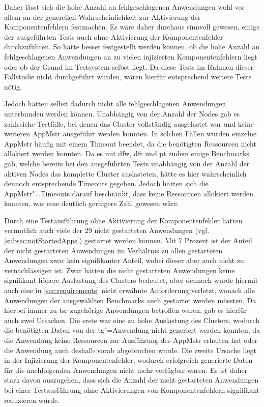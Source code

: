 Daher lässt sich die hohe Anzahl an fehlgeschlagenen Anwendungen wohl vor allem an der generellen Wahrscheinlichkeit zur Aktivierung der Komponentenfehlern festmachen.
Es wäre daher durchaus sinnvoll gewesen, einige der ausgeführten Tests auch ohne Aktivierung der Komponentenfehler durchzuführen.
So hätte besser festgestellt werden können, ob die hohe Anzahl an fehlgeschlagenen Anwendungen an zu vielen injizierten Komponentenfehlern liegt oder ob der Grund im Testsystem selbst liegt.
Da diese Tests im Rahmen dieser Fallstudie nicht durchgeführt wurden, wären hierfür entsprechend weitere Tests nötig.

Jedoch hätten selbst dadurch \uU nicht alle fehlgeschlagenen Anwendungen unterbunden werden können.
Unabhängig von der Anzahl der Nodes gab es zahlreiche Testfälle, bei denen das Cluster vollständig ausgelastet war und keine weiteren \gls{AppMstr} ausgeführt werden konnten.
In solchen Fällen wurden einzelne \gls{AppMstr} häufig mit einem Timeout beendet, da die benötigten Ressourcen nicht allokiert werden konnten.
Da es mit \acrlong{dfw}, \acrlong{dfr} und \acrlong{pt} zudem einige Benchmarks gab, welche bereits bei den ausgeführten Tests unabhängig von der Anzahl der aktiven Nodes das komplette Cluster auslasteten, hätte es hier wahrscheinlich dennoch entsprechende Timeouts gegeben.
Jedoch hätten sich die \gls{AppMstr}"=Timeouts darauf beschränkt, dass keine Ressourcen allokiert werden konnten, was eine deutlich geringere Zahl gewesen wäre.

Durch eine Testausführung ohne Aktivierung der Komponentenfehler hätten vermutlich auch viele der 29 nicht gestarteten Anwendungen (vgl. \cref{subsec:notStartedApps}) gestartet werden können.
Mit 7 Prozent ist der Anteil der nicht gestarteten Anwendungen im Verhältnis zu allen gestarteten Anwendungen zwar kein signifikanter Anteil, wobei dieser aber auch nicht zu vernachlässigen ist.
Zwar hätten die nicht gestarteten Anwendungen keine signifikant höhere Auslastung des Clusters bedeutet, aber dennoch wurde hiermit auch eine in \cref{sec:requirements} nicht erwähnte Anforderung verletzt, wonach alle Anwendungen der ausgewählten Benchmarks auch gestartet werden müssten.
Da hierbei immer zu \acrlong{tsr} zugehörige Anwendungen betroffen waren, gab es hierfür auch zwei Ursachen.
Die erste war eine zu hohe Auslastung des Clusters, wodurch die benötigten Daten von der \acrlong{tg}"=Anwendung nicht generiert werden konnten, da die Anwendung keine Ressourcen zur Ausführung des \gls{AppMstr} erhalten hat oder die Anwendung auch deshalb vorab abgebrochen wurde.
Die zweite Ursache liegt in der Injizierung der Komponentenfehler, wodurch erfolgreich generierte Daten für die nachfolgenden Anwendungen nicht mehr verfügbar waren.
Es ist daher stark davon auszugehen, dass sich die Anzahl der nicht gestarteten Anwendungen bei einer Testausführung ohne Aktivierungen von Komponentenfehlern signifikant reduzieren würde.

